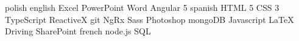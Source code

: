 \documentclass{arturmaciejaszek}
\begin{document}
    \begin{entrylist}
        \skilllist
        {}
        {
        \skill
        {polish}
        {\color{yellow}\faStar\faStar\faStar\faStar\faStar}
        \skill
        {english}
        {\color{yellow}\faStar\faStar\faStar\faStar\faStarHalfO}
        \skill
        {Excel}
        {\color{yellow}\faStar\faStar\faStar\faStarHalfO\color{gray}\faStarO}
        \skill
        {PowerPoint}
        {\color{yellow}\faStar\faStar\faStarHalfO\color{gray}\faStarO\faStarO}
        \skill
        {Word}
        {\color{yellow}\faStar\faStar\faStarHalfO\color{gray}\faStarO\faStarO}
        \skill
        {Angular 5}
        {\color{yellow}\faStar\faStar\faStarHalfO\color{gray}\faStarO\faStarO}
        \skill
        {spanish}
        {\color{yellow}\faStar\faStar\faStarHalfO\color{gray}\faStarO\faStarO}
        \skill
        {HTML 5}
        {\color{yellow}\faStar\faStar\faStarHalfO\color{gray}\faStarO\faStarO}
        \skill
        {CSS 3}
        {\color{yellow}\faStar\faStar\faStarHalfO\color{gray}\faStarO\faStarO}
        \skill
        {TypeScript}
        {\color{yellow}\faStar\faStar\faStarHalfO\color{gray}\faStarO\faStarO}
        \skill
        {ReactiveX}
        {\color{yellow}\faStar\faStar\color{gray}\faStarO\faStarO\faStarO}
        \skill
        {git}
        {\color{yellow}\faStar\faStar\color{gray}\faStarO\faStarO\faStarO}
        \skill
        {NgRx}
        {\color{yellow}\faStar\faStar\color{gray}\faStarO\faStarO\faStarO}
        \skill
        {Sass}
        {\color{yellow}\faStar\faStar\color{gray}\faStarO\faStarO\faStarO}
        \skill
        {Photoshop}
        {\color{yellow}\faStar\faStar\color{gray}\faStarO\faStarO\faStarO}
        \skill
        {mongoDB}
        {\color{yellow}\faStar\faStarHalfO\color{gray}\faStarO\faStarO\faStarO}
        \skill
        {Javascript}
        {\color{yellow}\faStar\faStarHalfO\color{gray}\faStarO\faStarO\faStarO}
        \skill
        {\LaTeX}
        {\color{yellow}\faStar\faStarHalfO\color{gray}\faStarO\faStarO\faStarO}
        \skill
        {Driving}
        {\color{yellow}\faStar\faStarHalfO\color{gray}\faStarO\faStarO\faStarO}
        \skill
        {SharePoint}
        {\color{yellow}\faStar\faStarHalfO\color{gray}\faStarO\faStarO\faStarO}
        \skill
        {french}
        {\color{yellow}\faStar\faStarHalfO\color{gray}\faStarO\faStarO\faStarO}
        \skill
        {node.js}
        {\color{yellow}\faStar\faStarHalfO\color{gray}\faStarO\faStarO\faStarO}
        \skill
        {SQL}
        {\color{yellow}\faStar \color{gray}\faStarO\faStarO\faStarO\faStarO}
        }

    \end{entrylist}

\end{document}
